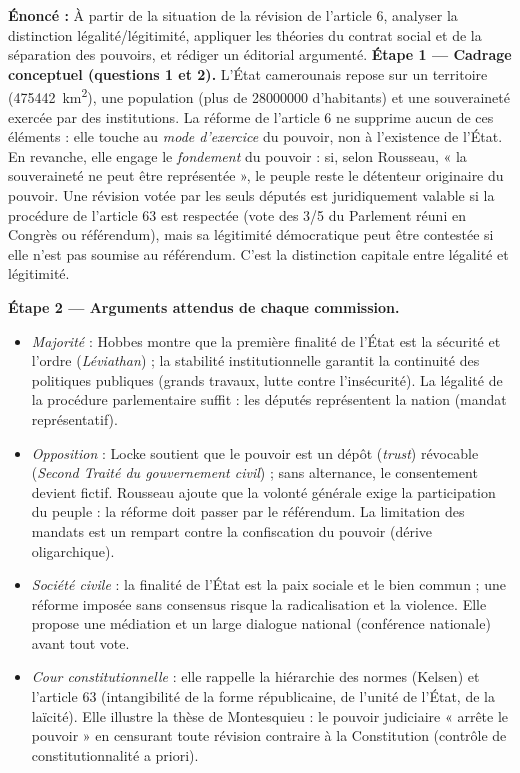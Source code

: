 \documentclass[11pt]{article}
\newcommand{\cle}[1]{{\popxbold\color{popdark}#1}}
\newcounter{popsec}
\newcounter{popsub}
\newcommand{\courssub}[1]{%
  \stepcounter{popsub}%
  \par\vspace{9pt}\noindent{\popxbold\fontsize{11.5}{13}\selectfont\color{popink}{\color{poporange}\thepopsec.\thepopsub}\hspace{6pt}#1}\par\nopagebreak\vspace{4pt}
}
\begin{document}
\courssub{Démarche et corrigé commenté}

\begin{exoresolu}
\textbf{Énoncé :} À partir de la situation de la révision de l'article 6, analyser la distinction légalité/légitimité, appliquer les théories du contrat social et de la séparation des pouvoirs, et rédiger un éditorial argumenté.
\tcblower
\textbf{Étape 1 — Cadrage conceptuel (questions 1 et 2).} L'État camerounais repose sur un territoire (\SI{475442}{km^2}), une population (plus de \num{28000000} d'habitants) et une souveraineté exercée par des institutions. La réforme de l'article 6 ne supprime aucun de ces éléments : elle touche au \emph{mode d'exercice} du pouvoir, non à l'existence de l'État. En revanche, elle engage le \emph{fondement} du pouvoir : si, selon Rousseau, « la souveraineté ne peut être représentée », le peuple reste le détenteur originaire du pouvoir. Une révision votée par les seuls députés est juridiquement valable si la procédure de l'article 63 est respectée (vote des 3/5 du Parlement réuni en Congrès ou référendum), mais sa légitimité démocratique peut être contestée si elle n'est pas soumise au référendum. C'est la distinction capitale entre \cle{légalité} et \cle{légitimité}.

\textbf{Étape 2 — Arguments attendus de chaque commission.}
\begin{itemize}
\item \emph{Majorité} : Hobbes montre que la première finalité de l'État est la sécurité et l'ordre (\emph{Léviathan}) ; la stabilité institutionnelle garantit la continuité des politiques publiques (grands travaux, lutte contre l'insécurité). La légalité de la procédure parlementaire suffit : les députés représentent la nation (mandat représentatif).
\item \emph{Opposition} : Locke soutient que le pouvoir est un dépôt (\emph{trust}) révocable (\emph{Second Traité du gouvernement civil}) ; sans alternance, le consentement devient fictif. Rousseau ajoute que la volonté générale exige la participation du peuple : la réforme doit passer par le référendum. La limitation des mandats est un rempart contre la confiscation du pouvoir (dérive oligarchique).
\item \emph{Société civile} : la finalité de l'État est la paix sociale et le bien commun ; une réforme imposée sans consensus risque la radicalisation et la violence. Elle propose une médiation et un large dialogue national (conférence nationale) avant tout vote.
\item \emph{Cour constitutionnelle} : elle rappelle la hiérarchie des normes (Kelsen) et l'article 63 (intangibilité de la forme républicaine, de l'unité de l'État, de la laïcité). Elle illustre la thèse de Montesquieu : le pouvoir judiciaire « arrête le pouvoir » en censurant toute révision contraire à la Constitution (contrôle de constitutionnalité a priori).
\end{itemize}


\end{exoresolu}
\end{document}
